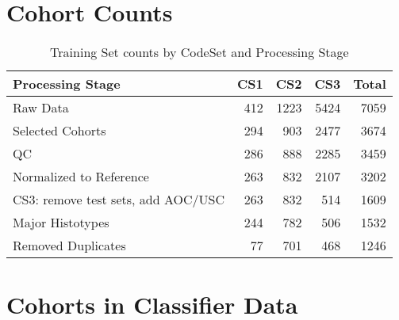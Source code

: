 \documentclass[
]{report}
\begin{document}
\section{Cohort Counts}\label{cohort-counts}

\begin{table}

\caption{\label{tab:cohort-counts}Training Set counts by CodeSet and Processing Stage}
\centering
\begin{tabular}[t]{l|r|r|r|r}
\hline
Processing Stage & CS1 & CS2 & CS3 & Total\\
\hline
Raw Data & 412 & 1223 & 5424 & 7059\\
\hline
Selected Cohorts & 294 & 903 & 2477 & 3674\\
\hline
QC & 286 & 888 & 2285 & 3459\\
\hline
Normalized to Reference & 263 & 832 & 2107 & 3202\\
\hline
CS3: remove test sets, add AOC/USC & 263 & 832 & 514 & 1609\\
\hline
Major Histotypes & 244 & 782 & 506 & 1532\\
\hline
Removed Duplicates & 77 & 701 & 468 & 1246\\
\hline
\end{tabular}
\end{table}

\section{Cohorts in Classifier Data}\label{cohorts-in-classifier-data}
\end{document}
